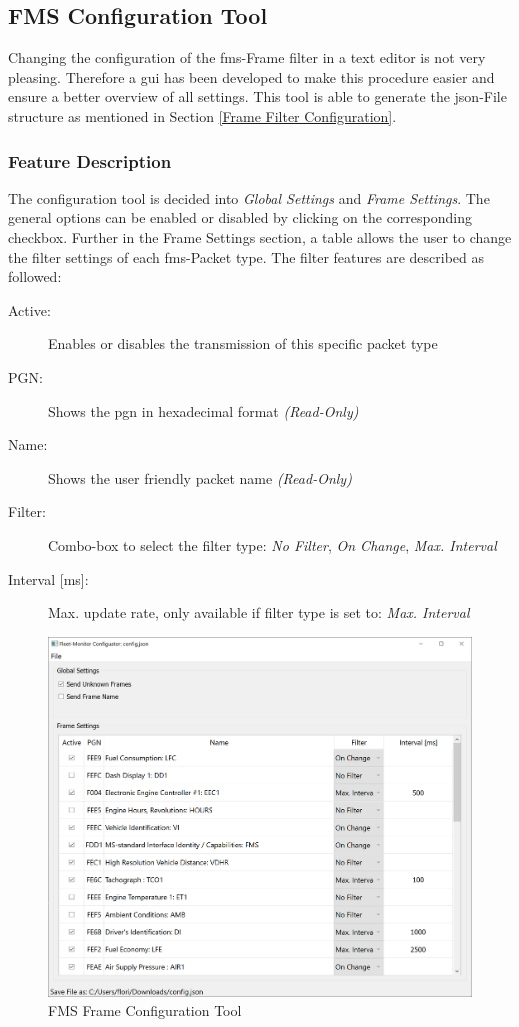 \newpage
\subsection{FMS Configuration Tool}
Changing the configuration of the \acrshort{fms}-Frame filter in a text editor is not very pleasing. Therefore a \acrfull{gui} has been developed to make this procedure easier and ensure a better overview of all settings. This tool is able to generate the \acrshort{json}-File structure as mentioned in Section \ref{Frame Filter Configuration}.

\subsubsection{Feature Description}
The configuration tool is decided into \textit{Global Settings} and \textit{Frame Settings}. The general options can be enabled or disabled by clicking on the corresponding checkbox. Further in the Frame Settings section, a table allows the user to change the filter settings of each \acrshort{fms}-Packet type. The filter features are described as followed:

\begin{description}
  \item[Active:] Enables or disables the transmission of this specific packet type
  \item[PGN:] Shows the \acrlong{pgn} in hexadecimal format \textit{(Read-Only)}
  \item[Name:] Shows the user friendly packet name \textit{(Read-Only)}
  \item[Filter:] Combo-box to select the filter type: \textit{No Filter}, \textit{On Change}, \textit{Max. Interval}
  \item[{Interval [ms]:}] Max. update rate, only available if filter type is set to: \textit{Max. Interval}
\end{description}

\medskip
\begin{figure}[h!]
	\centering
	\includegraphics[width=\textwidth]{images/Configuration-Tool_Screenshot}
	\caption{FMS Frame Configuration Tool}
	\label{fig:configuration_tool}
\end{figure}
\newpage

